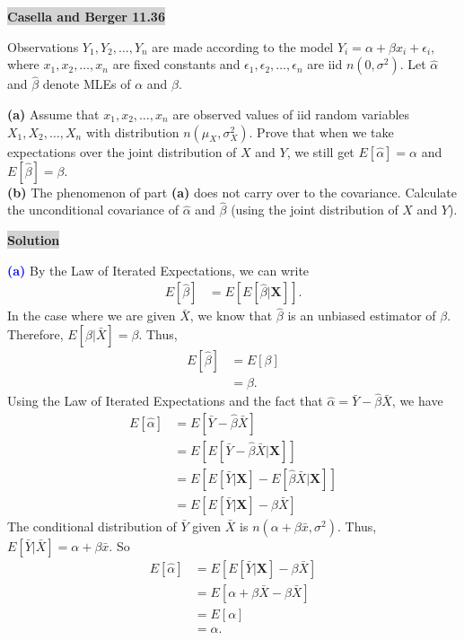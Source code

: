 \documentclass[12pt]{article}
\newcommand{\mybox}{%
    \collectbox{%
        \setlength{\fboxsep}{2pt}%
        \fbox{\BOXCONTENT}%
    }%
}
\begin{document}
\pagebreak


\noindent\mybox{\colorbox{lightgray}{\textbf{Casella and Berger 11.36}}}\hspace{3mm}\hrulefill 

\noindent Observations $Y_1, Y_2, \ldots, Y_n$ are made according to the model $Y_i = \alpha +\beta x_i + \epsilon_i$, where $x_1, x_2, \ldots, x_n$ are fixed constants and $\epsilon_1, \epsilon_2, \ldots, \epsilon_n$ are iid $n(0, \sigma^2)$. Let $\hat{\alpha}$ and $\hat{\beta}$ denote MLEs of $\alpha$ and $\beta$.
\begin{flushleft}
\textbf{(a)} Assume that $x_1, x_2, \ldots, x_n$ are observed values of iid random variables $X_1, X_2, \ldots, X_n$ with distribution $n(\mu_X, \sigma_X^2)$. Prove that when we take expectations over the joint distribution of $X$ and $Y$, we still get $E\left[\hat{\alpha}\right] = \alpha$ and $E\left[\hat{\beta}\right] = \beta$. \\
\textbf{(b)} The phenomenon of part \textbf{(a)} does not carry over to the covariance. Calculate the unconditional covariance of $\hat{\alpha}$ and $\hat{\beta}$ (using the joint distribution of $X$ and $Y$). 
\end{flushleft}

\noindent\mybox{\colorbox{lightgray}{\textbf{Solution}}} \hspace{3mm}\hrulefill

\noindent \textcolor{blue}{\textbf{(a)}} By the Law of Iterated Expectations, we can write
\begin{align}
E\left[\hat{\beta}\right] & = E\left[E\left[\hat{\beta}|\textbf{X}\right]\right].
\end{align}
In the case where we are given $\bar{X}$, we know that $\hat{\beta}$ is an unbiased estimator of $\beta$. Therefore, $E\left[\hat{\beta}|\bar{X}\right] = \beta.$ Thus, 
\begin{align}
E\left[\hat{\beta}\right] &= E\left[\beta\right] \\
&= \beta.
\end{align}
Using the Law of Iterated Expectations and the fact that $\hat{\alpha} = \bar{Y} - \hat{\beta}\bar{X}$, we have
\begin{align}
E\left[\hat{\alpha}\right] &= E\left[\bar{Y} - \hat{\beta} \bar{X}\right] \\
&= E\left[E\left[\bar{Y} - \hat{\beta}\bar{X} | \textbf{X}\right]\right] \\
&= E\left[E\left[\bar{Y}|\textbf{X}\right] - E\left[\hat{\beta}\bar{X}|\textbf{X}\right]\right] \\
&= E\left[E\left[\bar{Y}|\textbf{X}\right] - \beta\bar{X}\right]
\end{align}
The conditional distribution of $\bar{Y}$ given $\bar{X}$ is $n(\alpha + \beta\bar{x}, \sigma^2)$. Thus, $E\left[\bar{Y}|\bar{X}\right] = \alpha + \beta\bar{x}$. So
\begin{align}
E\left[\hat{\alpha}\right] &= E\left[E\left[\bar{Y}|\textbf{X}\right] - \beta\bar{X}\right] \\
&= E\left[\alpha + \beta\bar{X} - \beta\bar{X}\right] \\
&= E[\alpha] \\
&= \alpha.
\end{align}
\end{document}
